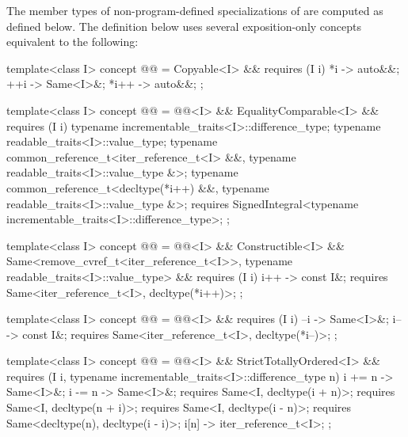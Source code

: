 {\color{newclr}
\pnum
The member types of non-program-defined specializations of
 are computed as defined below. The definition below uses
several exposition-only concepts equivalent to the following:

\begin{codeblock}
template<class I>
concept @@ =
  Copyable<I> && requires (I i) {
    { *i } -> auto&&;
    { ++i } -> Same<I>&;
    { *i++ } -> auto&&;
  };

template<class I>
concept @@ =
  @@<I> && EqualityComparable<I> && requires (I i) {
    typename incrementable_traits<I>::difference_type;
    typename readable_traits<I>::value_type;
    typename common_reference_t<iter_reference_t<I> &&,
                                typename readable_traits<I>::value_type &>;
    typename common_reference_t<decltype(*i++) &&,
                                typename readable_traits<I>::value_type &>;
    requires SignedIntegral<typename incrementable_traits<I>::difference_type>;
  };

template<class I>
concept @@ =
  @@<I> && Constructible<I> &&
  Same<remove_cvref_t<iter_reference_t<I>>, typename readable_traits<I>::value_type> &&
  requires (I i) {
    { i++ } -> const I&;
    requires Same<iter_reference_t<I>, decltype(*i++)>;
  };

template<class I>
concept @@ =
  @@<I> && requires (I i) {
    { --i } -> Same<I>&;
    { i-- } -> const I&;
    requires Same<iter_reference_t<I>, decltype(*i--)>;
  };

template<class I>
concept @@ =
  @@<I> && StrictTotallyOrdered<I> &&
  requires (I i, typename incrementable_traits<I>::difference_type n) {
    { i += n } -> Same<I>&;
    { i -= n } -> Same<I>&;
    requires Same<I, decltype(i + n)>;
    requires Same<I, decltype(n + i)>;
    requires Same<I, decltype(i - n)>;
    requires Same<decltype(n), decltype(i - i)>;
    { i[n] } -> iter_reference_t<I>;
  };
\end{codeblock}
} %

